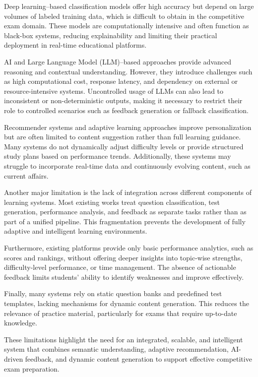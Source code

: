 \begin{sloppypar}
Deep learning--based classification models offer high accuracy but depend on large volumes of labeled training data, which is difficult to obtain in the competitive exam domain. These models are computationally intensive and often function as black-box systems, reducing explainability and limiting their practical deployment in real-time educational platforms.

AI and Large Language Model (LLM)--based approaches provide advanced reasoning and contextual understanding. However, they introduce challenges such as high computational cost, response latency, and dependency on external or resource-intensive systems. Uncontrolled usage of LLMs can also lead to inconsistent or non-deterministic outputs, making it necessary to restrict their role to controlled scenarios such as feedback generation or fallback classification.

Recommender systems and adaptive learning approaches improve personalization but are often limited to content suggestion rather than full learning guidance. Many systems do not dynamically adjust difficulty levels or provide structured study plans based on performance trends. Additionally, these systems may struggle to incorporate real-time data and continuously evolving content, such as current affairs.

Another major limitation is the lack of integration across different components of learning systems. Most existing works treat question classification, test generation, performance analysis, and feedback as separate tasks rather than as part of a unified pipeline. This fragmentation prevents the development of fully adaptive and intelligent learning environments.

Furthermore, existing platforms provide only basic performance analytics, such as scores and rankings, without offering deeper insights into topic-wise strengths, difficulty-level performance, or time management. The absence of actionable feedback limits students' ability to identify weaknesses and improve effectively.

Finally, many systems rely on static question banks and predefined test templates, lacking mechanisms for dynamic content generation. This reduces the relevance of practice material, particularly for exams that require up-to-date knowledge.

These limitations highlight the need for an integrated, scalable, and intelligent system that combines semantic understanding, adaptive recommendation, AI-driven feedback, and dynamic content generation to support effective competitive exam preparation.


\end{sloppypar}
